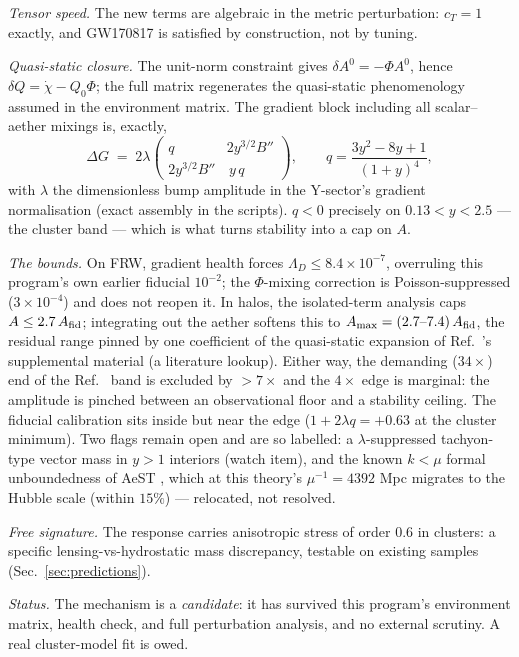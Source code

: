 \documentclass[aps,prd,twocolumn,10pt,nofootinbib,superscriptaddress]{revtex4-2}
\begin{document}
\emph{Tensor speed.} The new terms are algebraic in the metric perturbation: $c_T=1$ exactly, and
GW170817 \cite{GW170817} is satisfied by construction, not by tuning.

\emph{Quasi-static closure.} The unit-norm constraint gives $\delta A^0=-\Phi A^0$, hence
$\delta Q=\dot\chi-Q_0\Phi$; the full matrix regenerates the quasi-static phenomenology assumed in
the environment matrix. The gradient block including all scalar--aether mixings is, exactly,
\begin{equation}
\Delta G \;=\; 2\lambda
\begin{pmatrix} q & 2y^{3/2}B'' \\ 2y^{3/2}B'' & \,y\,q \end{pmatrix},
\qquad
q=\frac{3y^2-8y+1}{(1+y)^4},
\end{equation}
with $\lambda$ the dimensionless bump amplitude in the Y-sector's gradient normalisation (exact
assembly in the scripts). $q<0$ precisely on $0.13<y<2.5$ --- the cluster band --- which is what
turns stability into a cap on $A$.

\emph{The bounds.} On FRW, gradient health forces $\Lambda_D\le8.4\times10^{-7}$, overruling this
program's own earlier fiducial $10^{-2}$; the $\Phi$-mixing correction is Poisson-suppressed
($3\times10^{-4}$) and does not reopen it. In halos, the isolated-term analysis caps
$A\le2.7\,A_{\rm fid}$; integrating out the aether softens this to
$A_{\rm max}=(2.7\text{--}7.4)\,A_{\rm fid}$, the residual range pinned by one coefficient of the
quasi-static expansion of Ref.~\cite{SZ2021}'s supplemental material (a literature lookup). Either
way, the demanding ($34\times$) end of the Ref.~\cite{Mistele2023} band is excluded by
$>7\times$ and the $4\times$ edge is marginal: the amplitude is pinched between an observational
floor and a stability ceiling. The fiducial calibration sits inside but near the edge
($1+2\lambda q=+0.63$ at the cluster minimum). Two flags remain open and are so labelled: a
$\lambda$-suppressed tachyon-type vector mass in $y>1$ interiors (watch item), and the known
$k<\mu$ formal unboundedness of AeST \cite{SZ2021}, which at this theory's $\mu^{-1}=4392$ Mpc
migrates to the Hubble scale (within $15\%$) --- relocated, not resolved.

\emph{Free signature.} The response carries anisotropic stress of order $0.6$ in clusters: a
specific lensing-vs-hydrostatic mass discrepancy, testable on existing samples
(Sec.~\ref{sec:predictions}).

\emph{Status.} The mechanism is a \emph{candidate}: it has survived this program's environment
matrix, health check, and full perturbation analysis, and no external scrutiny. A real cluster-model
fit is owed.
\end{document}

